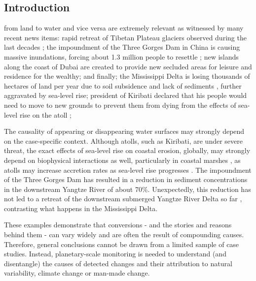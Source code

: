 \subsection{Introduction}
 from land to water and vice versa are extremely relevant as witnessed by many recent news items: rapid retreat of Tibetan Plateau glaciers observed during the last decades \citep{chen2016changes}; the impoundment of the Three Gorges Dam in China is causing massive inundations, forcing about 1.3 million people to resettle \citep{Jackson2000}; new islands along the coast of Dubai are created to provide new secluded areas for leisure and residence for the wealthy; and finally; the Mississippi Delta is losing thousands of hectares of land per year due to soil subsidence and lack of sediments \citep{Giosan2014}, further aggravated by sea-level rise; president of Kiribati declared that his people would need to move to new grounds to prevent them from dying from the effects of sea-level rise on the atoll \citep{Weiss2015}; 

The causality of appearing or disappearing water surfaces may strongly depend on the case‑specific context. Although atolls, such as Kiribati, are under severe threat, the exact effects of sea-level rise on coastal erosion, globally, may strongly depend on biophysical interactions as well, particularly in coastal marshes \citep{Storlazzi2015}, as atolls may increase accretion rates as sea-level rise progresses \citep{Kirwan2016}. The impoundment of the Three Gorges Dam has resulted in a reduction in sediment concentrations in the downstream Yangtze River of about 70\%. Unexpectedly, this reduction has not led to a retreat of the downstream submerged Yangtze River Delta so far \citep{Dai2014}, contrasting what happens in the Mississippi Delta.

These examples demonstrate that conversions - and the stories and reasons behind them - can vary widely and are often the result of compounding causes. Therefore, general conclusions cannot be drawn from a limited sample of case studies. Instead, planetary-scale monitoring is needed to understand (and disentangle) the causes of detected changes and their attribution to natural variability, climate change or man-made change. 

